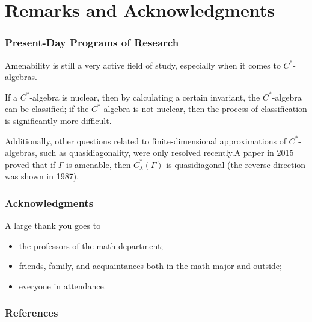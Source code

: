 \documentclass{beamer-custom}
\begin{document}
\section{Remarks and Acknowledgments}%
\begin{frame}
  \frametitle{Present-Day Programs of Research}
  Amenability is still a very active field of study, especially when it comes to $C^{\ast}$-algebras.\pause\newline

  If a $C^{\ast}$-algebra is nuclear, then by calculating a certain invariant, the $C^{\ast}$-algebra can be classified; if the $C^{\ast}$-algebra is not nuclear, then the process of classification is significantly more difficult.\pause\newline

  Additionally, other questions related to finite-dimensional approximations of $C^{\ast}$-algebras, such as quasidiagonality, were only resolved recently.\pause\:A paper in 2015 proved that if $\Gamma$ is amenable, then $C^{\ast}_{\lambda}\left( \Gamma \right)$ is quasidiagonal (the reverse direction was shown in 1987).
\end{frame}
\begin{frame}
  \frametitle{Acknowledgments}
  A large thank you goes to
  \begin{itemize}
    \item the professors of the math department;
    \item friends, family, and acquaintances both in the math major and outside;
    \item everyone in attendance.
  \end{itemize}
\end{frame}
\begin{frame}[allowframebreaks]
  \frametitle{References}
  \nocite{*}
  {\tiny \printbibliography}
\end{frame}
\end{document}
